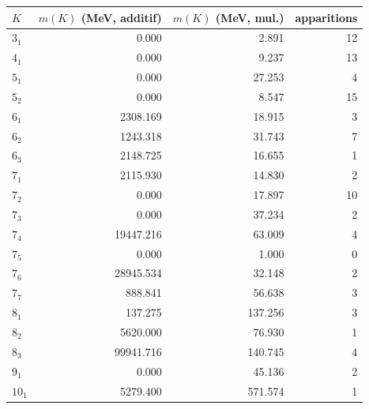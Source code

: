 \begin{center}
\renewcommand{\arraystretch}{1.1}
\begin{tabular}{lrrr}
\toprule
$K$ & $m(K)$ (MeV, additif) & $m(K)$ (MeV, mul.) & apparitions \\
\midrule
  $3_1$ & 0.000 & 2.891 & 12 \\
  $4_1$ & 0.000 & 9.237 & 13 \\
  $5_1$ & 0.000 & 27.253 & 4 \\
  $5_2$ & 0.000 & 8.547 & 15 \\
  $6_1$ & 2308.169 & 18.915 & 3 \\
  $6_2$ & 1243.318 & 31.743 & 7 \\
  $6_3$ & 2148.725 & 16.655 & 1 \\
  $7_1$ & 2115.930 & 14.830 & 2 \\
  $7_2$ & 0.000 & 17.897 & 10 \\
  $7_3$ & 0.000 & 37.234 & 2 \\
  $7_4$ & 19447.216 & 63.009 & 4 \\
  $7_5$ & 0.000 & 1.000 & 0 \\
  $7_6$ & 28945.534 & 32.148 & 2 \\
  $7_7$ & 888.841 & 56.638 & 3 \\
  $8_1$ & 137.275 & 137.256 & 3 \\
  $8_2$ & 5620.000 & 76.930 & 1 \\
  $8_3$ & 99941.716 & 140.745 & 4 \\
  $9_1$ & 0.000 & 45.136 & 2 \\
  $10_1$ & 5279.400 & 571.574 & 1 \\
\bottomrule
\end{tabular}
\end{center}
